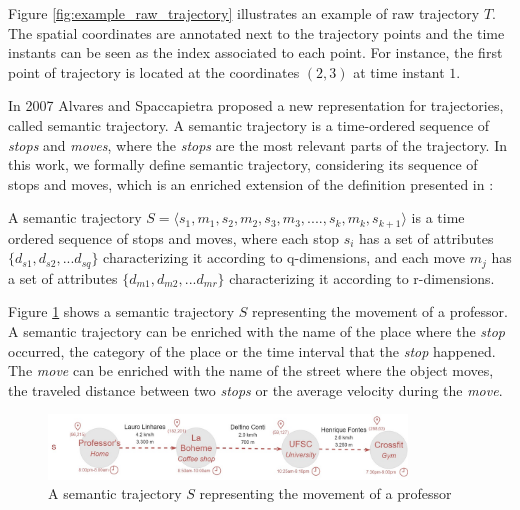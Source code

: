 Figure \ref{fig:example_raw_trajectory} illustrates an example of raw trajectory $T$. The spatial coordinates are annotated next to the trajectory points and the time instants can be seen as the index associated to each point. For instance, the first point of trajectory is located at the coordinates $(2,3)$ at time instant $1$.

In 2007 Alvares \cite{alvares2007model} and Spaccapietra \cite{Spaccapietra:2008:CVT:1347466.1347785} proposed a new representation for trajectories, called semantic trajectory. A semantic trajectory is a time-ordered sequence of \emph{stops} and \emph{moves}, where the \emph{stops} are the most relevant parts of the trajectory.
In this work, we formally define semantic trajectory, considering its sequence of stops and moves, which is an enriched extension of the definition presented in \cite{Spaccapietra:2008:CVT:1347466.1347785}:

\begin{definition}
\label{def:semantic_trajectory}
A semantic trajectory  \break
$S=\langle s_1, m_1, s_2, m_2, s_3,m_3, ...., s_k, m_k, s_{k+1} \rangle$ is a time ordered sequence of stops and moves, where each stop $s_i$ has a set of attributes $\{d_{s1}, d_{s2}, ...d_{sq}\}$ characterizing it according to q-dimensions, and each move $m_j$  has a set of attributes $\{d_{m1}, d_{m2}, ...d_{mr}\}$ characterizing it according to r-dimensions. 
\end{definition}

Figure \ref{fig:related_semantic_trajes} shows a semantic trajectory $S$ representing the movement of a professor. A semantic trajectory can be enriched with the name of the place where the \emph{stop} occurred, the category of the place or the time interval that the \emph{stop} happened. The \emph{move} can be enriched with the name of the street where the object moves, the traveled distance between two \emph{stops} or the average velocity during the \emph{move}.

\begin{figure}[h]
\centering
\includegraphics[width=0.85\textwidth]{Related_Works/Single_Semantic_trajectorie.jpg}
\caption{\label{fig:related_semantic_trajes}A semantic trajectory $S$ representing the movement of a professor}
\end{figure}

